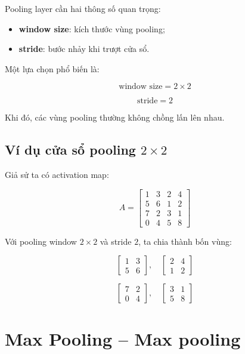 Pooling layer cần hai thông số quan trọng:

\begin{itemize}
    \item \textbf{window size}: kích thước vùng pooling;
    \item \textbf{stride}: bước nhảy khi trượt cửa sổ.
\end{itemize}

Một lựa chọn phổ biến là:

\[
    \text{window size}=2\times2
\]

\[
    \text{stride}=2
\]

Khi đó, các vùng pooling thường không chồng lấn lên nhau.

\subsection{Ví dụ cửa sổ pooling $2\times2$}

Giả sử ta có activation map:

\[
    A =
    \begin{bmatrix}
    1 & 3 & 2 & 4\\
    5 & 6 & 1 & 2\\
    7 & 2 & 3 & 1\\
    0 & 4 & 5 & 8
    \end{bmatrix}
\]

Với pooling window $2\times2$ và stride $2$, ta chia thành bốn vùng:

\[
    \begin{bmatrix}
    1 & 3\\
    5 & 6
    \end{bmatrix},
    \quad
    \begin{bmatrix}
    2 & 4\\
    1 & 2
    \end{bmatrix}
\]

\[
    \begin{bmatrix}
    7 & 2\\
    0 & 4
    \end{bmatrix},
    \quad
    \begin{bmatrix}
    3 & 1\\
    5 & 8
    \end{bmatrix}
\]

\section{Max Pooling -- Max pooling}

